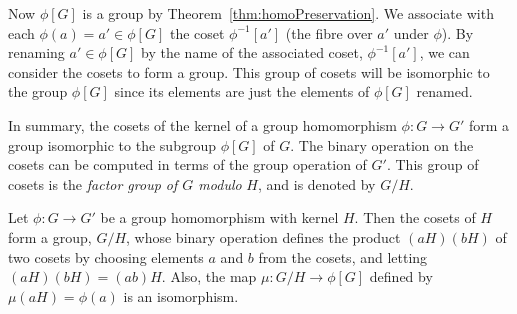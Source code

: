 Now $\phi[G]$ is a group by Theorem~\ref{thm:homoPreservation}.  We
associate with each $\phi(a) = a'\in \phi[G]$ the coset
$\phi^{-1}[a']$ (the fibre over $a'$ under $\phi$).
By renaming $a'\in \phi[G]$ by the name of the associated coset, 
$\phi^{-1}[a']$, we can consider the cosets to form a group.
This group of cosets will be isomorphic to the group $\phi[G]$ since
its elements are just the elements of $\phi[G]$ renamed. 

In summary, the cosets of the kernel of a group homomorphism
$\phi:G\to G'$ form a group isomorphic to the subgroup
$\phi[G]$ of $G$.  The binary operation on the cosets can be computed
in terms of the group operation of $G'$.  This group of cosets is the
\emph{factor group of $G$ modulo} $H$, and is denoted by $G/H$.

\begin{theorem}\label{thm:factorGroup}
Let $\phi: G\to G'$ be a group homomorphism with kernel $H$.
Then the cosets of $H$ form a group, $G/H$, whose binary operation
defines the product $(aH)(bH)$ of two cosets by choosing elements $a$
and $b$ from the cosets, and letting $(aH)(bH) = (ab)H$.  Also, the
map $\mu: G/H \to \phi[G]$ defined by $\mu(aH) = \phi(a)$ is
an isomorphism.
\end{theorem}

